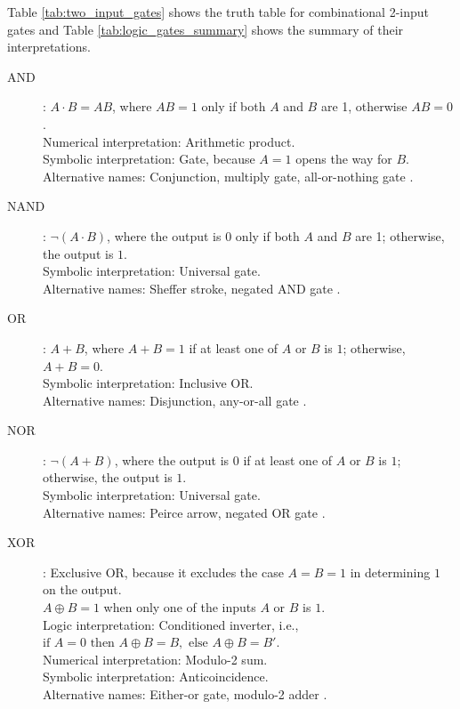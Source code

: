 Table \ref{tab:two_input_gates} shows the truth table for combinational 2-input gates and Table \ref{tab:logic_gates_summary} shows the summary of their interpretations.

\begin{description}
\item[AND]: \( A \cdot B = AB \), where \( AB = 1 \) only if both \( A \) and \( B \) are 1, otherwise \( AB = 0 \). \\
    Numerical interpretation: Arithmetic product. \\
    Symbolic interpretation:  Gate, because \( A = 1 \) opens the way for \( B \). \\
    Alternative names: Conjunction, multiply gate, all-or-nothing gate \cite{boole1854book, rosen2018}.

\item[NAND]: \( \neg (A \cdot B) \), where the output is \( 0 \) only if both \( A \) and \( B \) are 1; otherwise, the output is \( 1 \). \\
    Symbolic interpretation: Universal gate. \\
    Alternative names: Sheffer stroke, negated AND gate \cite{sheffer1913, rosen2018}.

\item[OR]: \( A + B \), where \( A + B = 1 \) if at least one of \( A \) or \( B \) is \( 1 \); otherwise, \( A + B = 0 \). \\
    Symbolic interpretation: Inclusive OR. \\
    Alternative names: Disjunction, any-or-all gate \cite{rosen2018}.

\item[NOR]: \( \neg (A + B) \), where the output is \( 0 \) if at least one of \( A \) or \( B \) is \( 1 \); otherwise, the output is \( 1 \). \\
    Symbolic interpretation: Universal gate. \\
    Alternative names: Peirce arrow, negated OR gate \cite{peirce1885, rosen2018}.

\item[XOR]: Exclusive OR, because it excludes the case \( A = B = 1 \) in determining \( 1 \) on the output. \\
    \( A \oplus B = 1 \) when only one of the inputs \( A \) or \( B \) is \( 1 \). \\
    Logic interpretation: Conditioned inverter, i.e., \( \text{if } A = 0 \text{ then } A \oplus B = B, \text{ else } A \oplus B = B' \). \\
    Numerical interpretation: Modulo-2 sum. \\
    Symbolic interpretation: Anticoincidence. \\
    Alternative names: Either-or gate, modulo-2 adder \cite{shannon48, rosen2018}.


\end{description}
